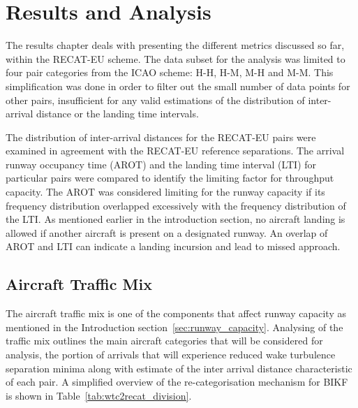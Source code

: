 \chapter{Results and Analysis\label{cha:results_analysis}}

The results chapter deals with presenting the different metrics discussed so far, within the RECAT-EU scheme. The data subset for the analysis was limited to four pair categories from the ICAO scheme: H-H, H-M, M-H and M-M. This simplification was done in order to filter out the small number of data points for other pairs, insufficient for any valid estimations of the distribution of inter-arrival distance or the landing time intervals. 

The distribution of inter-arrival distances for the RECAT-EU pairs were examined in agreement with the RECAT-EU reference separations. The arrival runway occupancy time (AROT) and the landing time interval (LTI) for particular pairs were compared to identify the limiting factor for throughput capacity. The AROT was considered limiting for the runway capacity if its frequency distribution overlapped excessively with the frequency distribution of the LTI. As mentioned earlier in the introduction section, no aircraft landing is allowed if another aircraft is present on a designated runway. An overlap of AROT and LTI can indicate a landing incursion and lead to missed approach. 

\section{Aircraft Traffic Mix\label{sec:traffic_mix}}

The aircraft traffic mix is one of the components that affect runway capacity as mentioned in the Introduction section~\ref{sec:runway_capacity}. Analysing of the traffic mix outlines the main aircraft categories that will be considered for analysis, the portion of arrivals that will experience reduced wake turbulence separation minima along with estimate of the inter arrival distance characteristic of each pair. A simplified overview of the re-categorisation mechanism for BIKF is shown in Table~\ref{tab:wtc2recat_division}.

